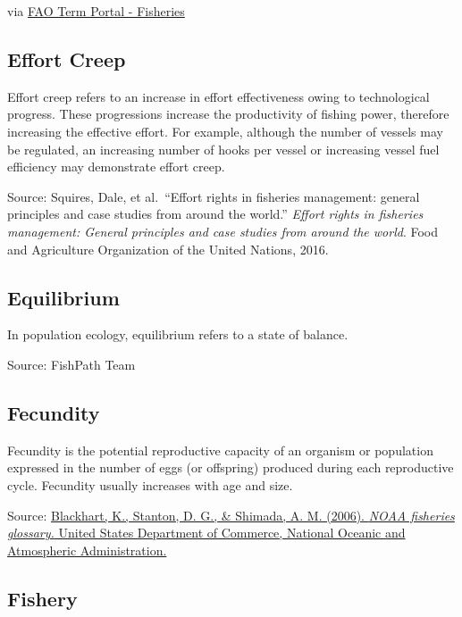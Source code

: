 \documentclass[
  11pt,
]{book}
\begin{document}
via \href{http://www.fao.org/fishery/glossary/en}{FAO Term Portal - Fisheries}

\hypertarget{effort-creep}{%
\subsection{Effort Creep}\label{effort-creep}}

Effort creep refers to an increase in effort effectiveness owing to technological progress. These progressions increase the productivity of fishing power, therefore increasing the effective effort. For example, although the number of vessels may be regulated, an increasing number of hooks per vessel or increasing vessel fuel efficiency may demonstrate effort creep.

Source: Squires, Dale, et al.~``Effort rights in fisheries management: general principles and case studies from around the world.'' \emph{Effort rights in fisheries management: General principles and case studies from around the world}. Food and Agriculture Organization of the United Nations, 2016.

\hypertarget{equilibrium}{%
\subsection{Equilibrium}\label{equilibrium}}

In population ecology, equilibrium refers to a state of balance.

Source: FishPath Team

\hypertarget{fecundity}{%
\subsection{Fecundity}\label{fecundity}}

Fecundity is the potential reproductive capacity of an organism or population expressed in the number of eggs (or offspring) produced during each reproductive cycle. Fecundity usually increases with age and size.

Source: \href{https://repository.library.noaa.gov/view/noaa/12856}{Blackhart, K., Stanton, D. G., \& Shimada, A. M. (2006). \emph{NOAA fisheries glossary.} United States Department of Commerce, National Oceanic and Atmospheric Administration.}

\hypertarget{fishery}{%
\subsection{Fishery}\label{fishery}}
\end{document}
